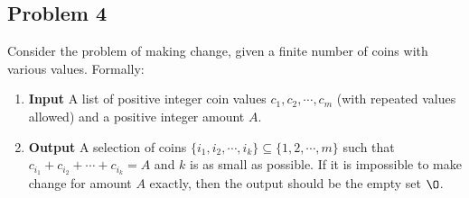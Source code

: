 \documentclass[11pt]{article}
\begin{document}
\subsection*{Problem 4}
Consider the problem of making change, given a finite number of coins with various values. Formally:
\begin{enumerate}
  \item \textbf{Input} A list of positive integer coin values $c_1, c_2, \cdots, c_m$ (with repeated values allowed) and a positive integer amount $A$.
  \item \textbf{Output}  A selection of coins $\{i_1,i_2,\cdots,i_k\}\subseteq \{1,2,\cdots,m\}$ such that $c_{i_1} +c_{i_2} +\cdots+c_{i_k} = A$ and $k$ is as small as possible. If it is impossible to make change for amount $A$ exactly, then the output should be the empty set $\O$.
\end{enumerate}
\end{document}
